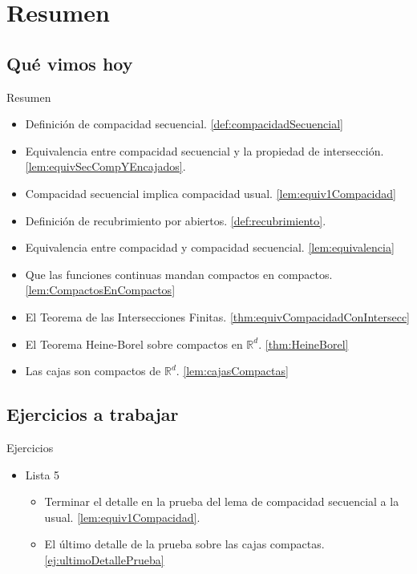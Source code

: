 \documentclass[utf8]{beamer}
\theoremstyle{plain}
\theoremstyle{definition}
\theoremstyle{remark}
\numberwithin{equation}{section}
\newcommand{\bR}{\mathbb{R}}    %
\begin{document}
\section*{Resumen}

\subsection*{Qu\'e vimos hoy}
\begin{frame}{Resumen}

  \begin{itemize}
  \item Definición de compacidad secuencial. \ref{def:compacidadSecuencial}
  \item Equivalencia entre compacidad secuencial y la propiedad de intersección. \ref{lem:equivSecCompYEncajados}.
  \item Compacidad secuencial implica compacidad usual. \ref{lem:equiv1Compacidad}
  \item Definición de recubrimiento por abiertos. \ref{def:recubrimiento}.
  \item Equivalencia entre compacidad y compacidad secuencial. \ref{lem:equivalencia}
  \item Que las funciones continuas mandan compactos en compactos. \ref{lem:CompactosEnCompactos}
  \item El Teorema de las Intersecciones Finitas. \ref{thm:equivCompacidadConIntersecc}
  \item El Teorema Heine-Borel sobre compactos en $\bR^d$. \ref{thm:HeineBorel}
  \item Las cajas son compactos de $\bR^d$. \ref{lem:cajasCompactas}
  \end{itemize}
  
\end{frame}

\subsection*{Ejercicios a trabajar}
\begin{frame}{Ejercicios}
    
  \begin{itemize}
    \item
      Lista 5
      \begin{itemize}
      \item Terminar el detalle en la prueba del lema de compacidad secuencial a la usual. \ref{lem:equiv1Compacidad}.
      \item El último detalle de la prueba sobre las cajas compactas. \ref{ej:ultimoDetallePrueba}
      \end{itemize}
    \end{itemize}
  
\end{frame}
\end{document}
